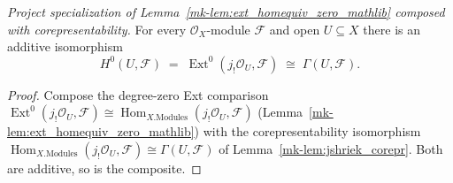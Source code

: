 \begin{lemma}\label{mk-lem:absolute_cohomology_zero}
  \leanok

  \textit{Project specialization of Lemma~\ref{mk-lem:ext_homequiv_zero_mathlib} composed with
  corepresentability.}
  For every \(\mathcal{O}_X\)-module \(\mathcal{F}\) and open \(U \subseteq X\) there is an additive
  isomorphism
  \[
    H^0(U, \mathcal{F}) \;=\; \operatorname{Ext}^0(j_!\mathcal{O}_U, \mathcal{F})
      \;\cong\; \Gamma(U, \mathcal{F}).
  \]
\end{lemma}
\begin{proof}
  \leanok
  Compose the degree-zero Ext comparison
  \(\operatorname{Ext}^0(j_!\mathcal{O}_U, \mathcal{F}) \cong
  \operatorname{Hom}_{X.\mathrm{Modules}}(j_!\mathcal{O}_U, \mathcal{F})\)
  (Lemma~\ref{mk-lem:ext_homequiv_zero_mathlib}) with the corepresentability isomorphism
  \(\operatorname{Hom}_{X.\mathrm{Modules}}(j_!\mathcal{O}_U, \mathcal{F}) \cong \Gamma(U,
  \mathcal{F})\) of Lemma~\ref{mk-lem:jshriek_corepr}. Both are additive, so is the composite.
\end{proof}

